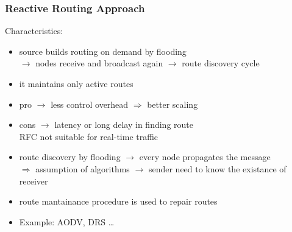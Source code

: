 \subsubsection{Reactive Routing Approach}
Characteristics:
\begin{itemize}
    \item source builds routing on demand by flooding\\$\rightarrow$ nodes receive and broadcast again $\rightarrow$ route discovery cycle
    \item it maintains only active routes
    \item pro $\rightarrow$ less control overhead $\Rightarrow$ better scaling
    \item cons $\rightarrow$ latency or long delay in finding route\\
    RFC not suitable for real-time traffic
    \item route discovery by flooding $\rightarrow$ every node propagates the message\\
    $\Rightarrow$ assumption of algorithms $\rightarrow$ sender need to know the existance of receiver
    \item route mantainance procedure is used to repair routes
    \item Example: AODV, DRS \dots
\end{itemize}

